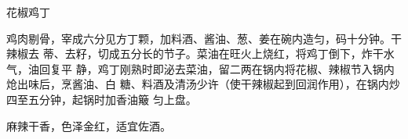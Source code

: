 \begin{recipe}{花椒鸡丁}

\ingredients


\preparation

鸡肉剔骨，宰成六分见方丁颗，加料酒、酱油、葱、姜在碗内造匀，码十分钟。干辣椒去
蒂、去籽，切成五分长的节子。菜油在旺火上烧红，将鸡丁倒下，炸干水气，油回复平
静，鸡丁刚熟时即泌去菜油，留二两在锅内将花椒、辣椒节入锅内炝出味后，烹酱油、白
糖、料酒及清汤少许（使干辣椒起到回润作用），在锅内炒四至五分钟，起锅时加香油簸
匀上盘。

\features

麻辣干香，色泽金红，适宜佐酒。

\end{recipe}

